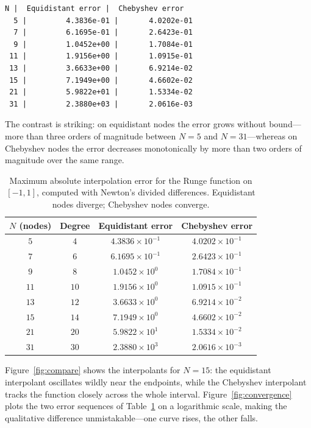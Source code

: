 \documentclass[12pt, a4paper]{article}
\theoremstyle{plain}
\theoremstyle{definition}
\theoremstyle{remark}
\begin{document}
\begin{lstlisting}[language={}, caption={Console output produced by the simulation.}, label={lst:out}]
  N |  Equidistant error |  Chebyshev error
  5 |         4.3836e-01 |       4.0202e-01
  7 |         6.1695e-01 |       2.6423e-01
  9 |         1.0452e+00 |       1.7084e-01
 11 |         1.9156e+00 |       1.0915e-01
 13 |         3.6633e+00 |       6.9214e-02
 15 |         7.1949e+00 |       4.6602e-02
 21 |         5.9822e+01 |       1.5334e-02
 31 |         2.3880e+03 |       2.0616e-03
\end{lstlisting}

The contrast is striking: on equidistant nodes the error grows without bound---more than three orders of magnitude between $N=5$ and $N=31$---whereas on Chebyshev nodes the error decreases monotonically by more than two orders of magnitude over the same range.

\begin{table}[H]
    \centering
    \renewcommand{\arraystretch}{1.2}
    \begin{tabular}{c c c c}
        \toprule
        $N$ (nodes) & Degree & Equidistant error & Chebyshev error \\
        \midrule
        $5$  & $4$  & $4.3836 \times 10^{-1}$ & $4.0202 \times 10^{-1}$ \\
        $7$  & $6$  & $6.1695 \times 10^{-1}$ & $2.6423 \times 10^{-1}$ \\
        $9$  & $8$  & $1.0452 \times 10^{0}$  & $1.7084 \times 10^{-1}$ \\
        $11$ & $10$ & $1.9156 \times 10^{0}$  & $1.0915 \times 10^{-1}$ \\
        $13$ & $12$ & $3.6633 \times 10^{0}$  & $6.9214 \times 10^{-2}$ \\
        $15$ & $14$ & $7.1949 \times 10^{0}$  & $4.6602 \times 10^{-2}$ \\
        $21$ & $20$ & $5.9822 \times 10^{1}$  & $1.5334 \times 10^{-2}$ \\
        $31$ & $30$ & $2.3880 \times 10^{3}$  & $2.0616 \times 10^{-3}$ \\
        \bottomrule
    \end{tabular}
    \caption{Maximum absolute interpolation error for the Runge function on $[-1,1]$, computed with Newton's divided differences. Equidistant nodes diverge; Chebyshev nodes converge.}
    \label{tab:errors}
\end{table}

Figure~\ref{fig:compare} shows the interpolants for $N = 15$: the equidistant interpolant oscillates wildly near the endpoints, while the Chebyshev interpolant tracks the function closely across the whole interval. Figure~\ref{fig:convergence} plots the two error sequences of Table~\ref{tab:errors} on a logarithmic scale, making the qualitative difference unmistakable---one curve rises, the other falls.
\end{document}
